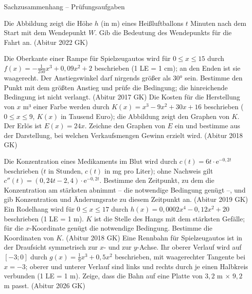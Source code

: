 \begin{aufgabe}{Sachzusammenhang – Prüfungsaufgaben}
\begin{teile}
\teil Die Abbildung zeigt die Höhe $h$ (in m) eines Heißluftballons $t$ Minuten nach dem Start mit dem Wendepunkt $W$. Gib die Bedeutung des Wendepunkts für die Fahrt an. \hfill (Abitur 2022 GK)

\begin{ksys}[xmin=0,xmax=20,ymin=0,ymax=90,xstep=5,ystep=10,xlabel=t in min,ylabel=h in m,ablesen]   \end{ksys}
\teil Die Oberkante einer Rampe für Spielzeugautos wird für $0 \le x \le 15$ durch $f(x) = -\frac{1}{250}x^3 + 0{,}09x^2 + 2$ beschrieben (1 LE = 1 cm); an den Enden ist sie waagerecht. Der Anstiegswinkel darf nirgends größer als $30°$ sein. Bestimme den Punkt mit dem größten Anstieg und prüfe die Bedingung; die hinreichende Bedingung ist nicht verlangt. \hfill (Abitur 2017 GK)
\teil Die Kosten für die Herstellung von $x$ m³ einer Farbe werden durch $K(x) = x^3 - 9x^2 + 30x + 16$ beschrieben ($0 \le x \le 9$, $K(x)$ in Tausend Euro); die Abbildung zeigt den Graphen von $K$. Der Erlös ist $E(x) = 24x$. Zeichne den Graphen von $E$ ein und bestimme aus der Darstellung, bei welchen Verkaufsmengen Gewinn erzielt wird. \hfill (Abitur 2018 GK)

\begin{ksys}[xmin=0,xmax=9,ymin=0,ymax=300,xstep=1,ystep=50,xlabel=x in m³,ylabel=K,ablesen]  \end{ksys}
\teil Die Konzentration eines Medikaments im Blut wird durch $c(t) = 6t \cdot \mathrm{e}^{-0{,}2t}$ beschrieben ($t$ in Stunden, $c(t)$ in mg pro Liter); ohne Nachweis gilt $c''(t) = (0{,}24t - 2{,}4) \cdot \mathrm{e}^{-0{,}2t}$. Bestimme den Zeitpunkt, zu dem die Konzentration am stärksten abnimmt – die notwendige Bedingung genügt –, und gib Konzentration und Änderungsrate zu diesem Zeitpunkt an. \hfill (Abitur 2019 GK)
\teil Ein Rodelhang wird für $0 \le x \le 17$ durch $h(x) = 0{,}0002x^4 - 0{,}12x^2 + 20$ beschrieben (1 LE = 1 m). $K$ ist die Stelle des Hangs mit dem stärksten Gefälle; für die $x$-Koordinate genügt die notwendige Bedingung. Bestimme die Koordinaten von $K$. \hfill (Abitur 2018 GK)
\teil Eine Rennbahn für Spielzeugautos ist in der Draufsicht symmetrisch zur $x$- und zur $y$-Achse. Ihr oberer Verlauf wird auf $[-3; 0]$ durch $g(x) = \frac{1}{9}x^3 + 0{,}5x^2$ beschrieben, mit waagerechter Tangente bei $x = -3$; oberer und unterer Verlauf sind links und rechts durch je einen Halbkreis verbunden (1 LE = 1 m). Zeige, dass die Bahn auf eine Platte von $3{,}2$ m $\times$ $9{,}2$ m passt. \hfill (Abitur 2026 GK)
\end{teile}
\end{aufgabe}

